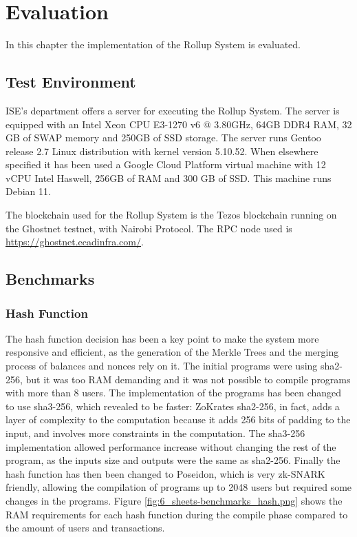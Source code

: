\chapter{Evaluation\label{cha:chapter6}}

In this chapter the implementation of the Rollup System is evaluated.



\section{Test Environment\label{sec:testenvir}}

ISE's department offers a server for executing the Rollup System. The server is equipped with an Intel Xeon CPU E3-1270 v6 @ 3.80GHz, 64GB DDR4 RAM, 32 GB of SWAP memory and 250GB of SSD storage. The server runs Gentoo release 2.7 Linux distribution with kernel version 5.10.52. When elsewhere specified it has been used a Google Cloud Platform virtual machine with 12 vCPU Intel Haswell, 256GB of RAM and 300 GB of SSD. This machine runs Debian 11.

The blockchain used for the Rollup System is the Tezos blockchain running on the Ghostnet testnet, with Nairobi Protocol. The RPC node used is \url{https://ghostnet.ecadinfra.com/}.


\section{Benchmarks\label{sec:benchmarks}}

\subsection{Hash Function\label{subsec:6_hashfunc}}

The hash function decision has been a key point to make the system more responsive and efficient, as the generation of the Merkle Trees and the merging process of balances and nonces rely on it. The initial programs were using sha2-256, but it was too RAM demanding and it was not possible to compile programs with more than 8 users. The implementation of the programs has been changed to use sha3-256, which revealed to be faster: ZoKrates sha2-256, in fact, adds a layer of complexity to the computation because it adds 256 bits of padding to the input, and involves more constraints in the computation. The sha3-256 implementation allowed performance increase without changing the rest of the program, as the inputs size and outputs were the same as sha2-256.
Finally the hash function has then been changed to Poseidon, which is very zk-SNARK friendly, allowing the compilation of programs up to 2048 users but required some changes in the programs. Figure \ref{fig:6_sheets-benchmarks_hash.png} shows the RAM requirements for each hash function during the compile phase compared to the amount of users and transactions.

